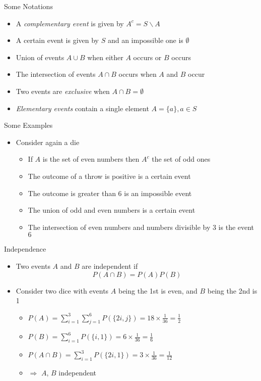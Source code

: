 \documentclass{beamer}
\begin{document}
\begin{frame}{Some Notations}  
\begin{itemize}
 \item A \emph{complementary event} is given by $A^c = S \backslash A$ 
\item A certain event is given by $S$ and an impossible one is $\emptyset$
\item Union of events $A \cup B$ when either $A$ occurs or $B$ occurs
\item The intersection of events $A \cap B$ occurs when $A$  and $B$ occur
\item Two events are \emph{exclusive} when $A \cap B = \emptyset$ 
\item \emph{Elementary events} contain a single element $A = \{a\}, a \in S$ 
\end{itemize} 
\end{frame}

\begin{frame}{Some Examples} 
\begin{itemize} 
 \item Consider again a die
\begin{itemize}
\item If $A$ is the set of even numbers then $A^c$ the set of odd ones
\item The outcome of a throw is positive is a certain event 
\item The outcome is greater than 6 is an impossible event 
\item The union of odd and even numbers is a certain event 
\item The intersection of even numbers and numbers divisible by 3 is the event ${6}$
\end{itemize}
 \end{itemize}
\end{frame}

\begin{frame}{Independence} 
\begin{itemize}
 \item Two events $A$ and $B$ are independent if 
\begin{displaymath} 
 P(A \cap B) = P(A)P(B)
\end{displaymath}
\item Consider two dice with events $A$ being the 1st is even, and $B$ being the 2nd is 1
\begin{itemize}
\item $P(A) = \sum_{i=1}^3 \sum_{j=1}^6 P(\{2i, j\}) = 18 \times \frac{1}{36} = \frac{1}{2}$
\item $P(B) =  \sum_{i=1}^6 P(\{i, 1\}) = 6 \times \frac{1}{36} = \frac{1}{6}$
\item $P(A \cap B) = \sum_{i=1}^3 P(\{2i, 1\}) = 3 \times \frac{1}{36}  = \frac{1}{12}$ 
\item $\Rightarrow$ $A$, $B$ independent 
\end{itemize}
\end{itemize}
\end{frame}
\end{document}
